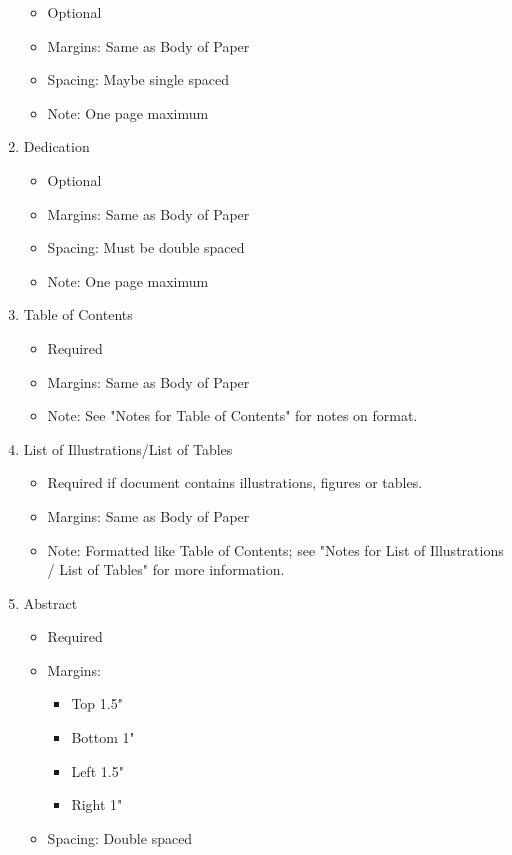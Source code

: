 \documentclass[draft]{ua-thesis}
\begin{document}
\begin{enumerate}
\begin{itemize}
        \item Optional
        \item Margins: Same as Body of Paper
        \item Spacing: Maybe single spaced
        \item Note: One page maximum
        \end{itemize}
  \item Dedication
        \begin{itemize}
        \item Optional
        \item Margins: Same as Body of Paper
        \item Spacing: Must be double spaced
        \item Note: One page maximum
        \end{itemize}
  \item Table of Contents
        \begin{itemize}
        \item Required
        \item Margins: Same as Body of Paper
        \item Note: See "Notes for Table of Contents" for notes on format.
        \end{itemize}
  \item List of Illustrations/List of Tables
        \begin{itemize}
        \item Required if document contains illustrations, figures or tables.
        \item Margins: Same as Body of Paper
        \item Note: Formatted like Table of Contents; see "Notes for List of
          Illustrations / List of Tables" for more information.
        \end{itemize}
  \item Abstract
        \begin{itemize}
        \item Required
        \item Margins:
             \begin{itemize}
             \item Top 1.5"
             \item Bottom 1"
             \item Left 1.5"
             \item Right 1"
             \end{itemize}
        \item Spacing: Double spaced

\end{itemize}
\end{enumerate}
\end{document}
